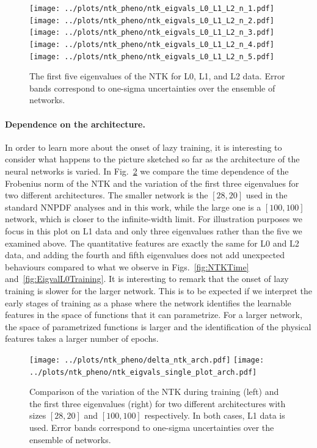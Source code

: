 \begin{figure}[ht!]
  \centering
  \texttt{[image: ../plots/ntk\_pheno/ntk\_eigvals\_L0\_L1\_L2\_n\_1.pdf]}
  \texttt{[image: ../plots/ntk\_pheno/ntk\_eigvals\_L0\_L1\_L2\_n\_2.pdf]}
  \texttt{[image: ../plots/ntk\_pheno/ntk\_eigvals\_L0\_L1\_L2\_n\_3.pdf]}
  \texttt{[image: ../plots/ntk\_pheno/ntk\_eigvals\_L0\_L1\_L2\_n\_4.pdf]}
  \texttt{[image: ../plots/ntk\_pheno/ntk\_eigvals\_L0\_L1\_L2\_n\_5.pdf]}
  \vspace{0.5cm}
  \caption{The first five eigenvalues of the NTK for L0, L1, and L2 data. Error
  bands correspond to one-sigma uncertainties over the ensemble of networks.}
  \label{fig:EigvalsComparison}
\end{figure}

\FloatBarrier

\paragraph{Dependence on the architecture.}
In order to learn more about the onset of lazy training, it is interesting to consider what happens to 
the picture sketched so far as the architecture of the neural networks is varied. In Fig.~\ref{fig:NTKTimeDiffArch}
we compare the time dependence of the Frobenius norm of the NTK and the variation of the first three eigenvalues
for two different architectures. The smaller network is the $[28,20]$ used in the standard NNPDF
analyses and in this work, while the large one is a $[100,100]$ network, which is closer to the infinite-width
limit. For illustration purposes we focus in this plot on L1 data and only three eigenvalues rather than the five
we examined above. The quantitative features are exactly the same for L0 and L2 data, and adding the fourth 
and fifth eigenvalues does not add unexpected behaviours compared to what we observe in Figs.~\ref{fig:NTKTime} 
and~\ref{fig:EigvalL0Training}. It is interesting to remark that the onset of lazy training is slower 
for the larger network. This is to be expected if we interpret the early stages of training as a phase where 
the network identifies the learnable features in the space of functions that it can parametrize. For a 
larger network, the space of parametrized functions is larger and the identification of the physical 
features takes a larger number of epochs. 
\begin{figure}[ht!]
  \centering
  \texttt{[image: ../plots/ntk\_pheno/delta\_ntk\_arch.pdf]}
  \texttt{[image: ../plots/ntk\_pheno/ntk\_eigvals\_single\_plot\_arch.pdf]}
  \caption{Comparison of the variation of the NTK during training (left) and the
  first three eigenvalues (right) for two different architectures with sizes
  $[28,20]$ and $[100,100]$ respectively. In both cases, L1 data is used. Error
  bands correspond to one-sigma uncertainties over the ensemble of networks.}
  \label{fig:NTKTimeDiffArch}
\end{figure}

